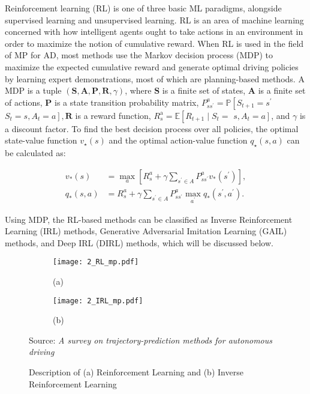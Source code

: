 Reinforcement learning (RL) is one of three basic ML paradigms, alongside supervised learning and unsupervised learning. RL is an area of machine learning concerned with how intelligent agents ought to take actions in an environment in order to maximize the notion of cumulative reward. When RL is used in the field of \ac{MP} for \ac{AD}, most methods use the Markov decision process (MDP) to maximize the expected cumulative reward and generate optimal driving policies by learning expert demonstrations, most of which are planning-based methods. A MDP is a tuple $(\boldsymbol{S}, \boldsymbol{A}, \boldsymbol{P}, \boldsymbol{R}, \gamma)$, where $\boldsymbol{S}$ is a finite set of states, $\boldsymbol{A}$ is a finite set of actions, $\boldsymbol{P}$ is a state transition probability matrix, $P_{s s^{\prime}}^a=\mathbb{P}\left[S_{t+1}=s^{\prime}\right.$ $\left.S_t=s, A_t=a\right], \boldsymbol{R}$ is a reward function, $R_s^{\mathrm{a}}=\mathbb{E}\left[R_{t+1} \mid S_t=\right.$ $\left.s, A_t=a\right]$, and $\gamma$ is a discount factor. To find the best decision process over all policies, the optimal state-value function $v_{\star}(s)$ and the optimal action-value function $q_{\star}(s, a)$ can be calculated as:

\begin{equation}
\begin{aligned}
	v_*(s) & =\max _a\left[R_s^a+\gamma \sum_{s^{\prime} \in A} P_{s s^{\prime}}^a v_*\left(s^{\prime}\right)\right], \\
	q_*(s, a) & =R_s^a+\gamma \sum_{s^{\prime} \in A} P_{s s^{\prime}}^a \max _{a^{\prime}} q_*\left(s^{\prime}, a^{\prime}\right) .
\end{aligned}
\end{equation}

Using MDP, the RL-based methods can be classified as Inverse Reinforcement Learning (IRL) methods, Generative Adversarial Imitation Learning (GAIL) methods, and Deep IRL (DIRL) methods, which will be discussed below.

\begin{figure}[t!]
	\begin{subfigure}{0.5\textwidth}
		\texttt{[image: 2\_RL\_mp.pdf]}
		\caption{(a)}
		\label{fig:2_RL_mp}
	\end{subfigure}
	\hfill
	\begin{subfigure}{0.5\textwidth}
		\texttt{[image: 2\_IRL\_mp.pdf]}
		\caption{(b)}
		\label{fig:2_IRL_mp}
	\end{subfigure}
	
	\caption[Reinforcement Learning vs Inverse Reinforcement Learning]{Description of (a) Reinforcement Learning and (b) Inverse Reinforcement Learning}
	Source: \textit{A survey on trajectory-prediction methods for autonomous driving} \cite{huang2022survey}
	\label{fig:2_RL_vs_IRL}
\end{figure}

